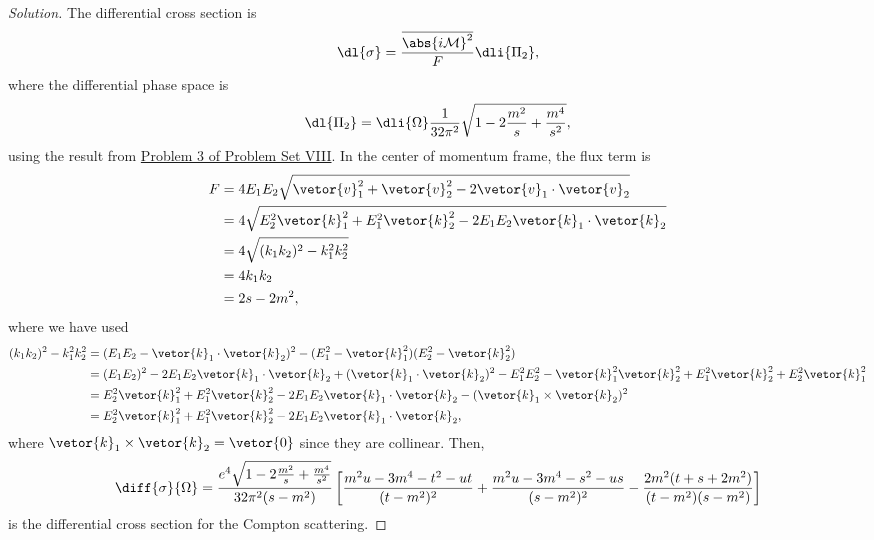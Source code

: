\begin{proof}[Solution]
   The differential cross section is
   \begin{equation*}
      \dl{\sigma} = \frac{\overline{\abs{i\mathcal{M}}^2}}{F} \dli{\Pi_2},
   \end{equation*}
   where the differential phase space is 
   \begin{equation*}
      \dl{\Pi_2} = \dli{\Omega}\frac{1}{32\pi^2} \sqrt{1 - 2\frac{m^2}{s} + \frac{m^4}{s^2}},
   \end{equation*}
   using the result from \href{https://github.com/louisradial/4305107-quantum-field-theory-i/releases/tag/pset8}{Problem 3 of Problem Set VIII}. In the center of momentum frame, the flux term is 
   \begin{align*}
      F &= 4 E_1 E_2 \sqrt{\vetor{v}_1^2 + \vetor{v}_2^2 - 2\vetor{v}_1 \cdot \vetor{v}_2}\\
        &= 4 \sqrt{E_2^2 \vetor{k}_1^2 + E_1^2 \vetor{k}_2^2 - 2 E_1 E_2 \vetor{k}_1 \cdot \vetor{k}_2}\\
        &= 4 \sqrt{(k_1 k_2)^2 - k_1^2 k_2^2}\\
        &= 4k_1 k_2\\
        &= 2s - 2m^2,
   \end{align*}
   where we have used
   \begin{align*}
      (k_1 k_2)^2 - k_1^2 k_2^2 &= (E_1E_2 - \vetor{k}_1 \cdot \vetor{k}_2)^2 - (E_1^2 - \vetor{k}_1^2)(E_2^2 - \vetor{k}_2^2)\\
                                &= (E_1 E_2)^2 - 2 E_1 E_2 \vetor{k}_1 \cdot \vetor{k}_2 + (\vetor{k}_1 \cdot \vetor{k}_2)^2 - E_1^2 E_2^2 - \vetor{k}_1^2 \vetor{k}_2^2 + E_1^2 \vetor{k}_2^2 + E_2^2 \vetor{k}_1^2\\
                                &= E_2^2 \vetor{k}_1^2 + E_1^2 \vetor{k}_2^2 - 2 E_1 E_2 \vetor{k}_1 \cdot \vetor{k}_2 - (\vetor{k}_1 \times \vetor{k}_2)^2\\
                                &= E_2^2 \vetor{k}_1^2 + E_1^2 \vetor{k}_2^2 - 2 E_1 E_2 \vetor{k}_1 \cdot \vetor{k}_2,
   \end{align*}
   where \(\vetor{k}_1 \times \vetor{k}_2 = \vetor{0}\) since they are collinear. Then,
   \begin{equation*}
      \diff{\sigma}{\Omega} = \frac{e^4\sqrt{1 - 2\frac{m^2}{s} + \frac{m^4}{s^2}}}{32\pi^2 (s - m^2)}\left[\frac{m^2u-3m^4 - t^2 - ut}{(t - m^2)^2} + \frac{m^2u-3m^4 - s^2 - us}{(s - m^2)^2}- \frac{2m^2(t + s + 2m^2)}{(t - m^2)(s - m^2)}\right]
   \end{equation*}
   is the differential cross section for the Compton scattering.
\end{proof}
